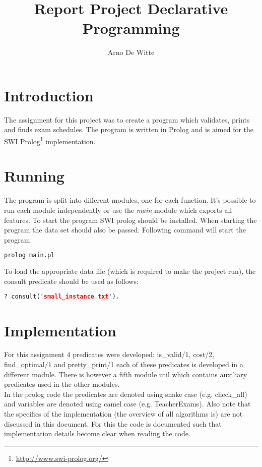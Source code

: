 \documentclass[11pt]{article}
\title{Report Project Declarative Programming}
\author{Arno De Witte}
\date{}
\begin{document}
\maketitle

\section{Introduction}
The assignment for this project was to create a program which validates, prints and finds exam schedules. The program is written in Prolog and is aimed for the SWI Prolog\footnote{\url{http://www.swi-prolog.org/}} implementation.

\section{Running}
The program is split into different modules, one for each function. It's possible to run each module independently or use the \emph{main} module which exports all features. To start the program SWI prolog should be installed. When starting the program the data set should also be passed. Following command will start the program:

\begin{lstlisting}[language=bash]
prolog main.pl
\end{lstlisting}
To load the appropriate data file (which is required to make the project run), the consult predicate should be used as follows:

\begin{lstlisting}[language=prolog]
? consult('small_instance.txt').
\end{lstlisting}

\section{Implementation}
For this assignment 4 predicates were developed: is\_valid/1, cost/2, find\_optimal/1 and pretty\_print/1 each of these predicates is developed in a different module. There is however a fifth module util which contains auxiliary predicates used in the other modules.\\
In the prolog code the predicates are denoted using snake case (e.g. check\_all) and variables are denoted using camel case (e.g. TeacherExams). Also note that the specifics of the implementation (the overview of all algorithms is) are not discussed in this document. For this the code is documented such that implementation details become clear when reading the code.
\end{document}
